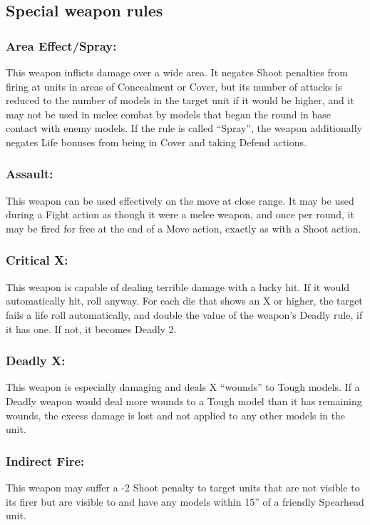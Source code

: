 \begin{multicols}{2}
\section*{Special weapon rules}

\subsubsection*{Area Effect/Spray:} This weapon inflicts damage over a wide area. It negates Shoot penalties from firing at units in areas of Concealment or Cover, but its number of attacks is reduced to the number of models in the target unit if it would be higher, and it may not be used in melee combat by models that began the round in base contact with enemy models. If the rule is called ``Spray'', the weapon additionally negates Life bonuses from being in Cover and taking Defend actions.

\subsubsection*{Assault:} This weapon can be used effectively on the move at close range. It may be used during a Fight action as though it were a melee weapon, and once per round, it may be fired for free at the end of a Move action, exactly as with a Shoot action.

\subsubsection*{Critical X:} This weapon is capable of dealing terrible damage with a lucky hit. If it would automatically hit, roll anyway. For each die that shows an X or higher, the target fails a life roll automatically, and double the value of the weapon's Deadly rule, if it has one. If not, it becomes Deadly 2.

\subsubsection*{Deadly X:} This weapon is especially damaging and deals X ``wounds'' to Tough models. If a Deadly weapon would deal more wounds to a Tough model than it has remaining wounds, the excess damage is lost and not applied to any other models in the unit.

\subsubsection*{Indirect Fire:} This weapon may suffer a -2 Shoot penalty to target units that are not visible to its firer but are visible to and have any models within 15'' of a friendly Spearhead unit.


\end{multicols}

